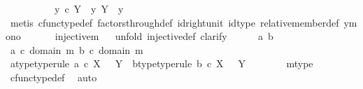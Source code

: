 \begin{isabellebody}
\ \ \isamarkupfalse%
\ \isanewline
\ \ \ \ \isamarkupfalse%
\ {\isachardoublequoteopen}y{}\ {\isasymin}\isactrlsub c\ Y\ {\isasymLongrightarrow}\ y{}\ {\isasymin}\isactrlbsub Y\isactrlesub \ {\isacharparenleft}{\kern0pt}{\isasymone}{\isacharcomma}{\kern0pt}\ y{}{\isacharparenright}{\kern0pt}{\isachardoublequoteclose}\isanewline
\ \ \ \ \ \ \isamarkupfalse%
\ {\isacharparenleft}{\kern0pt}metis\ cfunc{\isacharunderscore}{\kern0pt}type{\isacharunderscore}{\kern0pt}def\ factors{\isacharunderscore}{\kern0pt}through{\isacharunderscore}{\kern0pt}def\ id{\isacharunderscore}{\kern0pt}right{\isacharunderscore}{\kern0pt}unit{}\ id{\isacharunderscore}{\kern0pt}type\ relative{\isacharunderscore}{\kern0pt}member{\isacharunderscore}{\kern0pt}def{}\ y{}{\isacharunderscore}{\kern0pt}mono{\isacharparenright}{\kern0pt}\isanewline
\ \ \isamarkupfalse%
\isanewline
\isanewline
\isanewline
\ \ \isamarkupfalse%
\ {\isachardoublequoteopen}injective{\isacharparenleft}{\kern0pt}m{\isacharparenright}{\kern0pt}{\isachardoublequoteclose}\isanewline
\ \ \isamarkupfalse%
{\isacharparenleft}{\kern0pt}unfold\ injective{\isacharunderscore}{\kern0pt}def{\isacharcomma}{\kern0pt}\ clarify{\isacharparenright}{\kern0pt}\isanewline
\ \ \ \ \isamarkupfalse%
\ a\ b\ \isanewline
\ \ \ \ \isamarkupfalse%
\ {\isachardoublequoteopen}a\ {\isasymin}\isactrlsub c\ domain\ m{\isachardoublequoteclose}\ {\isachardoublequoteopen}b\ {\isasymin}\isactrlsub c\ domain\ m{\isachardoublequoteclose}\isanewline
\ \ \ \ \isamarkupfalse%
\ \isamarkupfalse%
\ a{\isacharunderscore}{\kern0pt}type{\isacharbrackleft}{\kern0pt}type{\isacharunderscore}{\kern0pt}rule{\isacharbrackright}{\kern0pt}{\isacharcolon}{\kern0pt}\ {\isachardoublequoteopen}a\ {\isasymin}\isactrlsub c\ X\ \ {\isasymCoprod}\ Y{\isachardoublequoteclose}\ \ b{\isacharunderscore}{\kern0pt}type{\isacharbrackleft}{\kern0pt}type{\isacharunderscore}{\kern0pt}rule{\isacharbrackright}{\kern0pt}{\isacharcolon}{\kern0pt}\ {\isachardoublequoteopen}b\ {\isasymin}\isactrlsub c\ X\ \ {\isasymCoprod}\ Y{\isachardoublequoteclose}\isanewline
\ \ \ \ \ \ \isamarkupfalse%
\ m{\isacharunderscore}{\kern0pt}type\ \isamarkupfalse%
\ cfunc{\isacharunderscore}{\kern0pt}type{\isacharunderscore}{\kern0pt}def\ \isamarkupfalse%
\ auto\isanewline
\ \ \ \ \isamarkupfalse%

\end{isabellebody}
